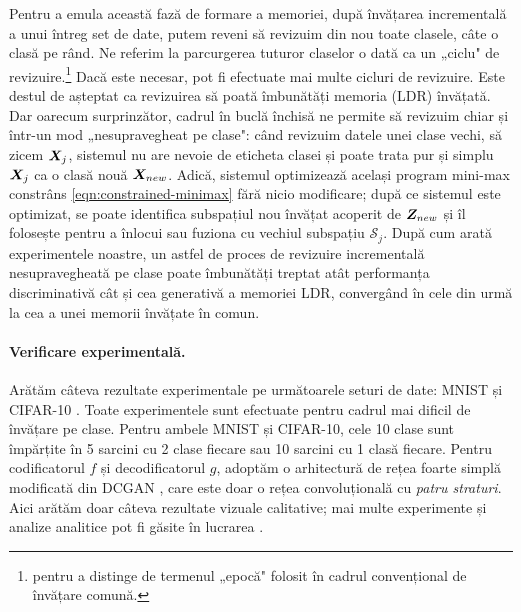 \documentclass[../../book-main_ro.tex]{subfiles}
\begin{document}
Pentru a emula această fază de formare a memoriei, după învățarea incrementală a unui întreg set de date, putem reveni să revizuim din nou toate clasele, câte o clasă pe rând. Ne referim la parcurgerea tuturor claselor o dată ca un „ciclu" de revizuire.\footnote{pentru a distinge de termenul „epocă" folosit în cadrul convențional de învățare comună.} Dacă este necesar, pot fi efectuate mai multe cicluri de revizuire. Este destul de așteptat ca revizuirea să poată îmbunătăți memoria (LDR) învățată. Dar oarecum surprinzător, cadrul în buclă închisă ne permite să revizuim chiar și într-un mod „{nesupravegheat pe clase}": când revizuim datele unei clase vechi, să zicem $\bm{X}_j$, sistemul nu are nevoie de eticheta clasei și poate trata pur și simplu $\bm{X}_j$ ca o clasă nouă $\bm{X}_{new}$. Adică, sistemul optimizează același program mini-max constrâns \eqref{eqn:constrained-minimax} fără nicio modificare; după ce sistemul este optimizat, se poate identifica subspațiul nou învățat acoperit de $\bm{Z}_{new}$ și îl folosește pentru a înlocui sau fuziona cu vechiul subspațiu $\mathcal{S}_j$. După cum arată experimentele noastre, un astfel de proces de revizuire incrementală nesupravegheată pe clase poate îmbunătăți treptat atât performanța discriminativă cât și cea generativă a memoriei LDR, convergând în cele din urmă la cea a unei memorii învățate în comun.

\paragraph{Verificare experimentală.}
Arătăm câteva rezultate experimentale pe următoarele seturi de date: MNIST \cite{lecun1998gradient} și CIFAR-10 \cite{krizhevsky2014cifar}. Toate experimentele sunt efectuate pentru cadrul mai dificil de învățare pe clase. Pentru ambele MNIST și CIFAR-10, cele 10 clase sunt împărțite în 5 sarcini cu 2 clase fiecare sau 10 sarcini cu 1 clasă fiecare. Pentru codificatorul $f$ și decodificatorul $g$, adoptăm o arhitectură de rețea foarte simplă modificată din DCGAN \cite{radford2016unsupervised}, care este doar o rețea convoluțională cu {\em patru straturi}. Aici arătăm doar câteva rezultate vizuale calitative; mai multe experimente și analize analitice pot fi găsite în lucrarea \cite{tong2023incremental}.
\end{document}
